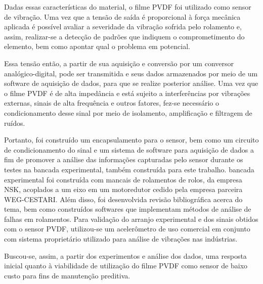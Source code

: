 \documentclass[
	12pt,				
	oneside,			
	a4paper,			
	english,			
	brazil,			
	]{abntex2ppgsi}
\begin{document}
Dadas essas características do material, o filme PVDF foi utilizado como sensor de vibração. Uma vez que a tensão de saída é proporcional à força mecânica aplicada é possível avaliar a severidade da vibração sofrida pelo rolamento e, assim, realizar-se a detecção de padrões que indiquem o comprometimento do elemento, bem como apontar qual o problema em potencial.


Essa tensão então, a partir de sua aquisição e conversão por um conversor analógico-digital, pode ser transmitida e seus dados armazenados por meio de um software de aquisição de dados, para que se realize posterior análise. Uma vez que o filme PVDF é de alta impedância e está sujeito a interferências por vibrações externas, sinais de alta frequência e outros fatores, fez-se necessário o condicionamento desse sinal por meio de isolamento, amplificação e filtragem de ruídos. 

Portanto, foi construído um encapsulamento para o sensor, bem como um circuito de condicionamento do sinal e um sistema de software para aquisição de dados a fim de promover a análise das informações capturadas pelo sensor durante os testes na bancada experimental, também construída para este trabalho. bancada experimental foi construída com mancais de rolamentos de rolos, da empresa NSK, acoplados a um eixo em um motoredutor cedido pela empresa parceira WEG-CESTARI. Além disso, foi desenvolvida revisão bibliográfica acerca do tema, bem como construídos softwares que implementam métodos de análise de falhas em rolamentos. Para validação do arranjo experimental e dos sinais obtidos com o sensor PVDF, utilizou-se um acelerômetro de uso comercial em conjunto com sistema proprietário utilizado para análise de vibrações nas indústrias.

Buscou-se, assim, a partir dos experimentos e análise dos dados, uma resposta inicial quanto à viabilidade de utilização do filme PVDF como sensor de baixo custo para fins de manutenção preditiva.

\end{document}
